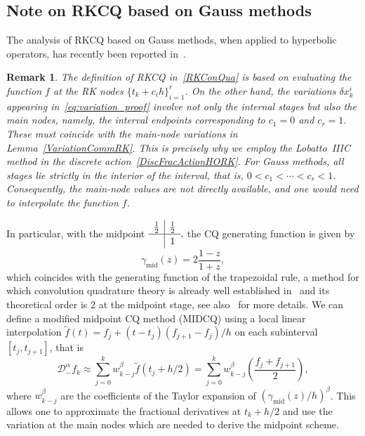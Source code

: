 \documentclass[a4paper,10pt,reqno]{amsart}
\newtheorem{remark}{Remark}[section]
\theoremstyle{definition}
\begin{document}
\subsection{Note on RKCQ based on Gauss methods}
The analysis of RKCQ based on Gauss methods, when applied to hyperbolic operators, has recently been reported in~\cite{LeMa}. %
\begin{remark}\label{rem:gaussRKCQ}
The definition of RKCQ in~\eqref{RKConQua} is based on evaluating the function \(f\) at the RK nodes \(\{t_k + c_i h\}_{i=1}^r\). On the other hand, the variations \(\delta x_k^i\) appearing in~\eqref{eq:variation_proof} involve not only the internal stages but also the main nodes, namely, the interval endpoints corresponding to \(c_1 = 0\) and \(c_r = 1\). These must coincide with the main-node variations in Lemma~\ref{VariationCommRK}. This is precisely why we employ the Lobatto~IIIC method in the discrete action~\eqref{DiscFracActionHORK}. For Gauss methods, all stages lie strictly in the interior of the interval, that is, \(0 < c_1 < \cdots < c_r < 1\). Consequently, the main-node values are not directly available, and one would need to interpolate the function \(f\).
 \end{remark}
In particular, with the  midpoint   $\setlength{\tabcolsep}{15pt}
\renewcommand{\arraystretch}{1.2}\begin{array}{c|c}
\frac{1}{2}   &  \frac{1}{2}   \\ \hline
     &  1
\end{array},$
the CQ generating function is  given by
$$\gamma_{\text{mid}}(z)=2\frac{1-z}{1+z},$$
which coincides with the generating function of the trapezoidal rule, a method for which convolution quadrature theory is already well established in~\cite{ErSa} and its theoretical order is $2$ at the midpoint stage, see also~\cite{LehSaBook} for more details.
We can define a modified midpoint CQ method (MIDCQ) using a local linear interpolation $\tilde f(t)=f_j+(t-t_j)(f_{j+1}-f_j)/h$ on each subinterval $[t_j,t_{j+1}]$, that is
$$\mathcal{D}_{-}^{\alpha} {f}_k\approx \sum_{j=0}^{k}w_{k-j}^{\beta}\tilde f\left(t_j+h/2\right)=\sum_{j=0}^{k}w_{k-j}^{\beta}\left( \frac{f_j+f_{j+1}}{2}\right),$$
where $w_{k-j}^{\beta}$ are the coefficients of the Taylor expansion of $(\gamma_{\text{mid}}(z)/h)^\beta$. This allows one to approximate the fractional derivatives at $t_k+h/2$ and use the variation at the main nodes which are needed to derive the midpoint scheme.
\end{document}

